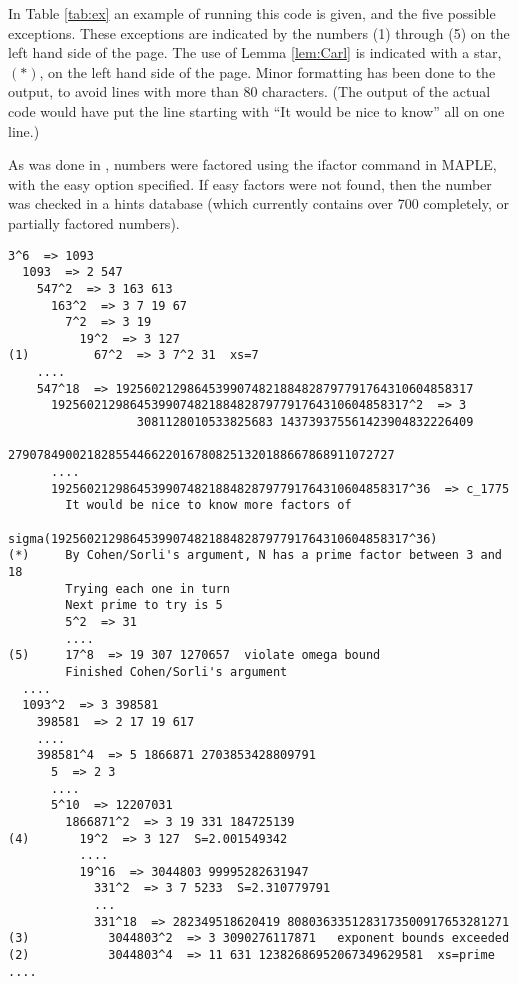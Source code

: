 \documentclass{article}
\begin{document}
In Table \ref{tab:ex} an example of running this code is given, and 
    the five possible exceptions.  
These exceptions are indicated by the numbers (1) through (5) on the 
    left hand side of the page.
The use of Lemma \ref{lem:Carl} is indicated with a star, $(*)$, on the 
    left hand side of the page.
Minor formatting has been done to the output, to avoid lines with more 
    than 80 characters.  
(The output of the actual code would have put the line starting with 
    ``It would be nice to know'' all on one line.)

As was done in \cite{Hare05a}, numbers were factored using the 
    ifactor command in MAPLE, with the easy option specified.
If easy factors were not found, then the number was checked in a 
    hints database (which currently contains over 700 completely, or 
    partially factored numbers).

\begin{table}
\caption{Parts of the proof that $\Omega(N) \geq 75$}
\label{tab:ex}
%
\begin{verbatim}
3^6  => 1093
  1093  => 2 547 
    547^2  => 3 163 613 
      163^2  => 3 7 19 67 
        7^2  => 3 19 
          19^2  => 3 127 
(1)         67^2  => 3 7^2 31  xs=7
    ....
    547^18  => 19256021298645399074821884828797791764310604858317 
      19256021298645399074821884828797791764310604858317^2  => 3 
                  3081128010533825683 143739375561423904832226409 
                  279078490021828554466220167808251320188667868911072727 
      ....
      19256021298645399074821884828797791764310604858317^36  => c_1775
        It would be nice to know more factors of
                   sigma(19256021298645399074821884828797791764310604858317^36) 
(*)     By Cohen/Sorli's argument, N has a prime factor between 3 and 18
        Trying each one in turn
        Next prime to try is 5
        5^2  => 31 
        ....
(5)     17^8  => 19 307 1270657  violate omega bound
        Finished Cohen/Sorli's argument
  ....
  1093^2  => 3 398581 
    398581  => 2 17 19 617
    ....
    398581^4  => 5 1866871 2703853428809791 
      5  => 2 3 
      ....
      5^10  => 12207031 
        1866871^2  => 3 19 331 184725139 
(4)       19^2  => 3 127  S=2.001549342
          ....
          19^16  => 3044803 99995282631947 
            331^2  => 3 7 5233  S=2.310779791
            ...
            331^18  => 282349518620419 8080363351283173500917653281271 
(3)           3044803^2  => 3 3090276117871   exponent bounds exceeded
(2)           3044803^4  => 11 631 12382686952067349629581  xs=prime
....
\end{verbatim}
\end{table}
\end{document}
